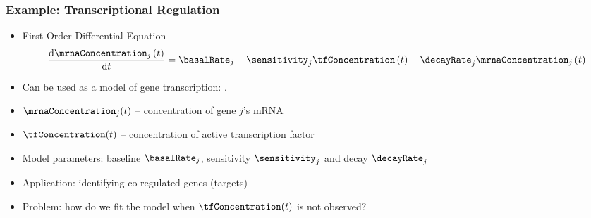 \begin{frame}
  \frametitle{Example: Transcriptional Regulation}
  \begin{itemize}
  \item <1->First Order Differential Equation \[
    \frac{\text{d}\mrnaConcentration_{j}\left(t\right)}{\text{d}t}=\basalRate_{j}+\sensitivity_{j}\tfConcentration\left(t\right)-\decayRate_{j}\mrnaConcentration_{j}\left(t\right)\]

  \item <2->Can be used as a model of gene transcription: \citealp{Barenco:ranked06,Gao:latent08}.
  \item <3->$\mrnaConcentration_{j}(t)$ -- concentration of gene $j$'s mRNA 
  \item <4->$\tfConcentration(t)$ -- concentration of active transcription factor 
  \item <5->Model parameters: baseline $\basalRate_{j}$, sensitivity $\sensitivity_{j}$ and
    decay $\decayRate_{j}$ 
  \item <6->Application: identifying co-regulated genes (targets) 
  \item <7->Problem: how do we fit the model when $\tfConcentration(t)$ is not observed?
  \end{itemize}
\end{frame}

%

